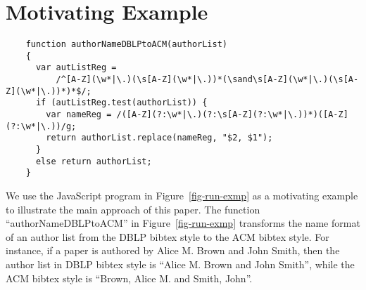 
\section{Motivating Example}\label{sec:mot}

\begin{figure*}[htbp]
\begin{center}
{
\small
\begin{verbatim}
    function authorNameDBLPtoACM(authorList)
    {
      var autListReg = 
          /^[A-Z](\w*|\.)(\s[A-Z](\w*|\.))*(\sand\s[A-Z](\w*|\.)(\s[A-Z](\w*|\.))*)*$/;
      if (autListReg.test(authorList)) {
        var nameReg = /([A-Z](?:\w*|\.)(?:\s[A-Z](?:\w*|\.))*)([A-Z](?:\w*|\.))/g;
        return authorList.replace(nameReg, "$2, $1");
      }
      else return authorList;
    }
\end{verbatim}
}
\end{center}
\caption{Change the author list from the DBLP format to the ACM format}
\label{fig-run-exmp}
\end{figure*}



We use the JavaScript program in Figure~\ref{fig-run-exmp} as a motivating example to illustrate the main approach of this paper. 
The function ``authorNameDBLPtoACM''  in Figure~\ref{fig-run-exmp} transforms the name format of an author list from the DBLP bibtex style to the ACM bibtex style. For instance,  if a paper is authored by Alice M. Brown and John Smith, then the author list in DBLP bibtex style is ``Alice M. Brown and John Smith'', while the ACM bibtex style is ``Brown, Alice M. and Smith, John''. 

